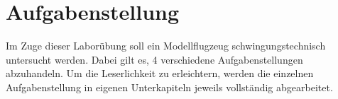 \chapter{Aufgabenstellung}
\label{sec: Einleitung}

Im Zuge dieser Laborübung soll ein Modellflugzeug schwingungstechnisch untersucht
werden. Dabei gilt es, 4 verschiedene Aufgabenstellungen abzuhandeln. Um die
Leserlichkeit zu erleichtern, werden die einzelnen Aufgabenstellung in eigenen
Unterkapiteln jeweils vollständig abgearbeitet.
